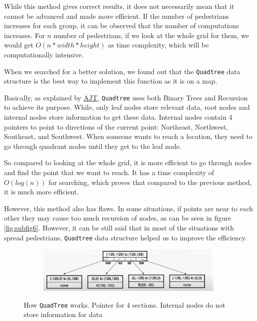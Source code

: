 While this method gives correct results, it does not necessarily mean that it cannot be advanced and made more efficient. If the number of pedestrians increases for each group, it can be observed that the number of computations increases. For $n$ number of pedestrians, if we look at the whole grid for them, we would get $O(n*width*height)$ as time complexity, which will be computationally intensive.

When we searched for a better solution, we found out that the \texttt{Quadtree} data structure is the best way to implement this function as it is on a map. 

Basically, as explained by \href{https://www.youtube.com/watch?v=OELWhbqaUWQ}{AJT}, \texttt{Quadtree} uses both Binary Trees and Recursion to achieve its purpose. While, only leaf nodes store relevant data, root nodes and internal nodes store information to get these data. Internal nodes contain 4 pointers to point to directions of the current point: Northeast, Northwest, Southeast, and Southwest. When someone wants to reach a location, they need to go through quadrant nodes until they get to the leaf node. 

So compared to looking at the whole grid, it is more efficient to go through nodes and find the point that we want to reach. It has a time complexity of $O(log(n))$ for searching, which proves that compared to the previous method, it is much more efficient.

However, this method also has flaws. In some situations, if points are near to each other they may cause too much recursion of nodes, as can be seen in figure \ref{fig:subfig6}. However, it can be still said that in most of the situations with spread pedestrians, \texttt{Quadtree} data structure helped us to improve the efficiency.

\begin{figure}
\begin{center}
    \centering
    \begin{subfigure}{\textwidth}
        \centering
        \includegraphics[width=\linewidth]{images/task4_quad1.png}
        \label{fig:subfig1}
    \end{subfigure}
    \caption{How \texttt{QuadTree} works. Pointer for 4 sections. Internal nodes do not store information for data}
\end{center}
\end{figure}


